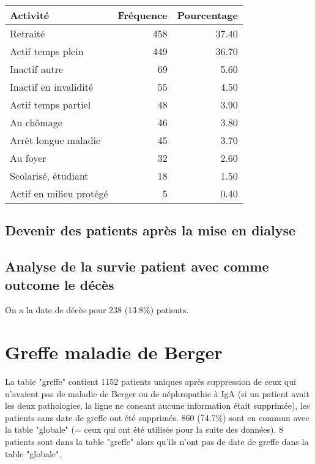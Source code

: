 \documentclass[11pt,a4paper]{article}\usepackage[]{graphicx}\usepackage[]{color}
\begin{document}
\begin{table}[H]
\centering
\begin{tabular}{lrr}
  \hline
Activité & Fréquence & Pourcentage \\ 
  \hline
Retraité & 458 & 37.40 \\ 
  Actif temps plein & 449 & 36.70 \\ 
  Inactif autre &  69 & 5.60 \\ 
  Inactif en invalidité &  55 & 4.50 \\ 
  Actif temps partiel &  48 & 3.90 \\ 
  Au chômage &  46 & 3.80 \\ 
  Arrêt longue maladie &  45 & 3.70 \\ 
  Au foyer &  32 & 2.60 \\ 
  Scolarisé, étudiant &  18 & 1.50 \\ 
  Actif en milieu protégé &   5 & 0.40 \\ 
   \hline
\end{tabular}
\end{table}


  \subsection{Devenir des patients après la mise en dialyse}
  
  \subsection{Analyse de la survie patient avec comme outcome le décès}
  
  On a la date de décès pour 238 (13.8\%) patients.

  
\section{Greffe maladie de Berger}

La table "greffe" contient 1152 patients uniques après suppression de ceux qui n'avaient pas de maladie de Berger ou de néphropathie à IgA (si un patient avait les deux pathologies, la ligne ne coneant aucune information était supprimée), les patients sans date de greffe ont été supprimés. 860 (74.7\%) sont en commun avec la table "globale" (= ceux qui ont été utilisés pour la suite des données). 8 patients sont dans la table "greffe" alors qu'ils n'ont pas de date de greffe dans la table "globale".
\end{document}
